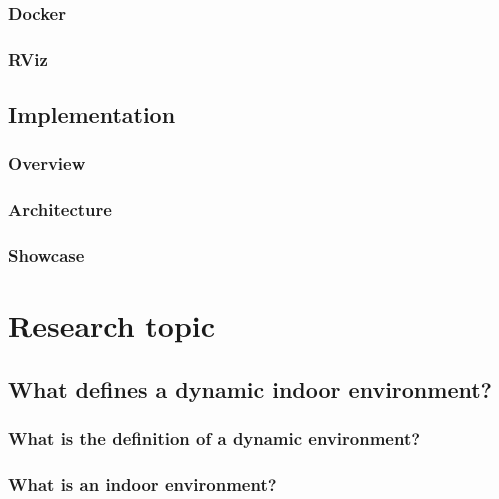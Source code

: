 \documentclass[12pt, a4paper]{report}
\begin{document}
      \subsection{Docker}
      
      \subsection{RViz}
      
    \section{Implementation}
    
      \subsection{Overview}
      
      \clearpage
      \subsection{Architecture}
      
      \clearpage
      \subsection{Showcase}
      

  \chapter{Research topic}
  
  \clearpage
    \section{What defines a dynamic indoor environment?}
    
      \subsection{What is the definition of a dynamic environment?}
      
      \subsection{What is an indoor environment?}
      
\end{document}

